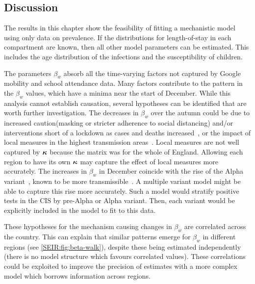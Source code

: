 \documentclass[thesis.tex]{subfiles}
\begin{document}
\subsection{Discussion} \label{SEIR:sec:discussion}

The results in this chapter show the feasibility of fitting a mechanistic model using only data on prevalence.
If the distributions for length-of-stay in each compartment are known, then all other model parameters can  be estimated.
This includes the age distribution of the infections and the susceptibility of children.


The parameters $\beta_w$ absorb all the time-varying factors not captured by Google mobility and school attendance data.
Many factors contribute to the pattern in the $\beta_w$ values, which have a minima near the start of December.
While this analysis cannot establish causation, several hypotheses can be identified that are worth further investigation.
The decreases in $\beta_w$ over the autumn could be due to increased caution(\eg masking or stricter adherence to social distancing) and/or interventions short of a lockdown as cases and deaths increased~\autocite{jarvisEffect}, or the impact of local measures in the highest transmission areas~\autocite{scottCovid19}.
Local measures are not well captured by $\bm{\kappa}$ because the matrix was for the whole of England.
Allowing each region to have its own $\bm{\kappa}$ may capture the effect of local measures more accurately.
The increases in $\beta_w$ in December coincide with the rise of the Alpha variant~\autocite{lythgoeLineage}, known to be more transmissible~\autocite{daviesEstimated}.
A multiple variant model might be able to capture this rise more accurately.
Such a model would stratify positive tests in the CIS by pre-Alpha or Alpha variant.
Then, each variant would be explicitly included in the model to fit to this data.

These hypotheses for the mechanism causing changes in $\beta_w$ are correlated across the country.
This can explain that similar patterns emerge for $\beta_w$ in different regions (see \cref{SEIR:fig:beta-walk}), despite these being estimated independently (\ie there is no model structure which favours correlated values).
These correlations could be exploited to improve the precision of estimates with a more complex model which borrows information across regions.
\end{document}
